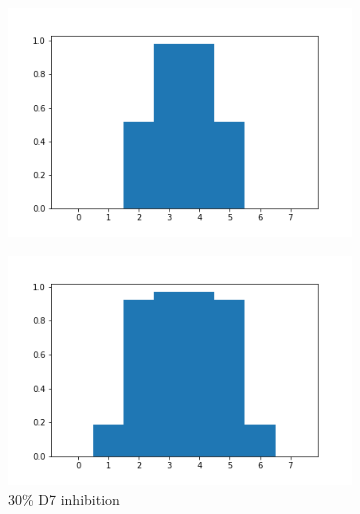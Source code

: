 \documentclass{article}
\begin{document}
\begin{figure}[h]
	\centering
	\begin{subfigure}[t]{0.32\linewidth}
		\centering
		\includegraphics[width = 1.0\linewidth, trim={20 20 20 20}, clip=true]{../figures/D7_inhib_10.png}
		\label{fig:dist0}	
	\end{subfigure}
	\hspace{0.001\linewidth}
	\begin{subfigure}[t]{0.32\linewidth}
		\centering
		\includegraphics[width = 1.0\linewidth, trim={20 20 20 20}, clip=true]{../figures/D7_inhib_07.png}
		\caption{30\% D7 inhibition}
		\label{fig:dist30}
	\end{subfigure}
	\hspace{0.001\linewidth}
	\begin{subfigure}[t]{0.32\linewidth}
		\centering

\end{subfigure}
\end{figure}
\end{document}
